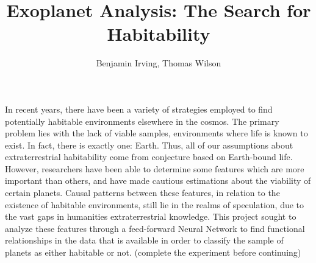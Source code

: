 \documentclass[11.5pt]{article}
\title{Exoplanet Analysis: The Search for Habitability}
\author{Benjamin Irving, Thomas Wilson}
\date{}
\begin{document}
\maketitle

\abstract
\>\>\>\>\> In recent years, there have been a variety of strategies employed to find potentially habitable environments elsewhere in the cosmos. The primary problem lies with the lack of viable samples, environments where life is known to exist. In fact, there is exactly one: Earth. Thus, all of our assumptions about extraterrestrial habitability come from conjecture based on Earth-bound life. However, researchers have been able to determine some features which are more important than others, and have made cautious estimations about the viability of certain planets. Causal patterns between these features, in relation to the existence of habitable environments, still lie in the realms of speculation, due to the vast gaps in humanities extraterrestrial knowledge. This project sought to analyze these features through a feed-forward Neural Network to find functional relationships in the data that is available in order to classify the sample of planets as either habitable or not. (complete the experiment before continuing)

\vspace{2mm}
\end{document}

